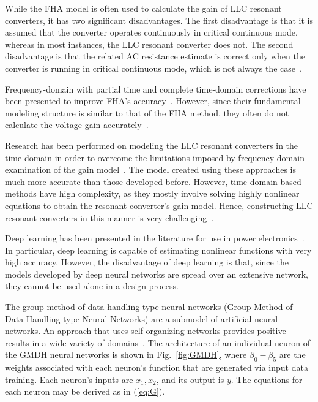 \documentclass{article} %
\begin{document}
While the FHA model is often used to calculate the gain of LLC resonant converters, it has two significant disadvantages. The first disadvantage is that it is assumed that the converter operates continuously in critical continuous mode, whereas in most instances, the LLC resonant converter does not. The second disadvantage is that the related AC resistance estimate is correct only when the converter is running in critical continuous mode, which is not always the case~\cite{Steigerwald1988,Ivensky2011,Menke2020,Shen2020,Shafiei2017,Applications2020,Kumar2019,Glitz2019,Hong2010,Fang2011,Deng2014,Hu2015}.

\par Frequency-domain with partial time and complete time-domain corrections have been presented to improve FHA's accuracy~\cite{Ivensky2011,Liu2016}. However, since their fundamental modeling structure is similar to that of the FHA method, they often do not calculate the voltage gain accurately~\cite{Menke2020,Shen2020,Shafiei2017,Applications2020,Kumar2019,Glitz2019,Hong2010,Fang2011,Deng2014,Hu2015,Wei2019,Wei2019b,Wei2019a}.

\par Research has been performed on modeling the LLC resonant converters in the time domain in order to overcome the limitations imposed by frequency-domain examination of the gain model~\cite{Menke2020,Shen2020,Shafiei2017,Applications2020,Kumar2019,Glitz2019,Hong2010,Fang2011,Deng2014,Hu2015,Wei2019a}. 
The model created using these approaches is much more accurate than those developed before. However, time-domain-based methods have high complexity, as they mostly involve solving highly nonlinear equations to obtain the resonant converter's gain model. Hence, constructing LLC resonant converters in this manner is very challenging~\cite{Wei2019,Wei2019b}.

\par Deep learning has been presented in the literature for use in power electronics~\cite{Lucia2020,Hajihosseini2020,Wang2019}. In particular, deep learning is capable of estimating nonlinear functions with very high accuracy. However, the disadvantage of deep learning is that, since the models developed by deep neural networks are spread over an extensive network, they cannot be used alone in a design process. 

\par The group method of data handling-type neural networks (Group Method of Data Handling-type Neural Networks) are a submodel of artificial neural networks. An approach that uses self-organizing networks provides positive results in a wide variety of domains~\cite{Heydari2021,Maric2010,Lin2015,Park2002,Iwasaki2004,Xiao2020,pukish2015polynet}. 
The architecture of an individual neuron of the GMDH neural networks is shown in Fig.~\ref{fig:GMDH}, where $\beta_{0}-\beta_{5}$ are the weights associated with each neuron's function that are generated via input data training. Each neuron's inputs are $x_{1},x_{2}$, and its output is $y$. The equations for each neuron may be derived as in (\ref{eq:G}).
\end{document}
